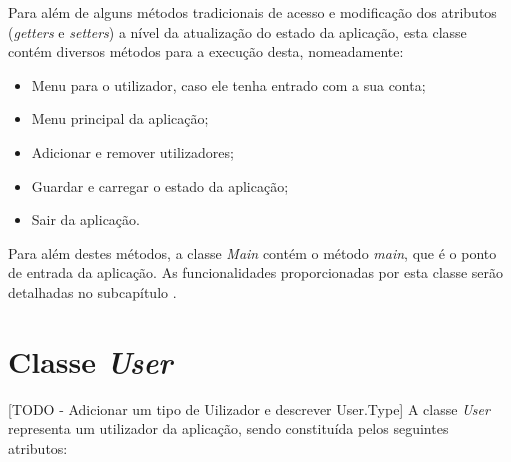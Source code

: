 \documentclass[a4paper,12pt]{scrreprt}
\begin{document}
    Para além de alguns métodos tradicionais de acesso e modificação dos atributos (\textit{getters} e \textit{setters}) a nível da atualização do estado da aplicação, esta classe contém diversos métodos para a execução desta, nomeadamente:
    \begin{itemize}
        \item Menu para o utilizador, caso ele tenha entrado com a sua conta;
        \item Menu principal da aplicação;
        \item Adicionar e remover utilizadores;
        \item Guardar e carregar o estado da aplicação;
        \item Sair da aplicação.
    \end{itemize}
    
    Para além destes métodos, a classe \textit{Main} contém o método \textit{main}, que é o ponto de entrada da aplicação.
    As funcionalidades proporcionadas por esta classe serão detalhadas no subcapítulo \textit{}.


\section{Classe \textit{User}}
    [TODO - Adicionar um tipo de Uilizador e descrever User.Type]
    A classe \textit{User} representa um utilizador da aplicação, sendo constituída pelos seguintes atributos:
\end{document}
